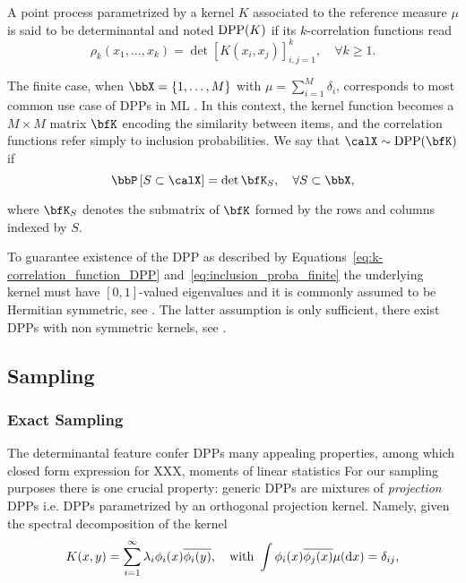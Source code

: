\documentclass[twoside,11pt]{article}
\begin{document}
    A point process parametrized by a kernel $K$ associated to the reference measure $\mu$ is said to be determinantal and noted $\operatorname{DPP}(K)$ if its $k$-correlation functions read
    \begin{equation}
    \label{eq:k-correlation_function_DPP}
      \rho_k(x_1,\dots,x_k) 
        = \det [K(x_i, x_j)]_{i,j=1}^k,
      \quad \forall k\geq 1.
    \end{equation}

    The finite case, when $\bbX = \lrcb{1,\dots,M}$ with $\mu=\sum_{i=1}^M \delta_i$, corresponds to most common use case of DPPs in ML \citep{KuTa12}.
    In this context, the kernel function becomes a $M\times M$ matrix $\bfK$ encoding the similarity between items, and the correlation functions refer simply to inclusion probabilities.
    We say that $\calX\sim \DPP(\bfK)$ if
    \begin{equation}
    \label{eq:inclusion_proba_finite}
      \Proba{S \subset \calX} = \det \bfK_S, 
        \quad\forall S\subset \bbX,
    \end{equation}

    where $\bfK_S$ denotes the submatrix of $\bfK$ formed by the rows and columns indexed by $S$.

    To guarantee existence of the DPP as described by Equations~\ref{eq:k-correlation_function_DPP} and~\ref{eq:inclusion_proba_finite} the underlying kernel must have $[0,1]$-valued eigenvalues and it is commonly assumed to be Hermitian symmetric, see \citep[Theorem 3]{Sos00}.
    The latter assumption is only sufficient, there exist DPPs with non symmetric kernels, see \citep{BoDiFu09}.

  \subsection{Sampling} %
  \label{sub:sampling}
  
    \subsubsection{Exact Sampling} %
    \label{ssub:exact_sampling}

      The determinantal feature confer DPPs many appealing properties, among which closed form expression for XXX, moments of linear statistics \etc
      For our sampling purposes there is one crucial property: generic DPPs are mixtures of \textit{projection} DPPs i.e. DPPs parametrized by an orthogonal projection kernel.
      Namely, given the spectral decomposition of the kernel 
      \begin{equation}
      \label{eq:eigdec_kernel}
        K(x,y)=\sum\limits_{i=1}^{\infty} \lambda_i \phi_i(x) \overline{\phi_i(y)},
        \quad \text{with }
        \int \phi_i(x) \overline{\phi_j(x)} \mu(\mathop{}\!\mathrm{d} x) = \delta_{ij},
      \end{equation}
\end{document}
